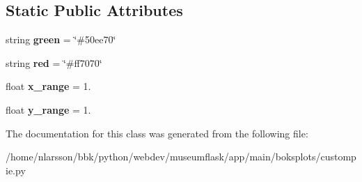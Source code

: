 \subsection*{Static Public Attributes}
\begin{DoxyCompactItemize}
\item 
\mbox{\label{classapp_1_1main_1_1boksplots_1_1custompie_1_1CustomPieBuilder_a37ff9d2647081d878e0f08febc66b9be}} 
string {\bfseries green} = \char`\"{}\#50ee70\char`\"{}
\item 
\mbox{\label{classapp_1_1main_1_1boksplots_1_1custompie_1_1CustomPieBuilder_a8014d4ebb12a2c910a7ca9b3cb6aa76b}} 
string {\bfseries red} = \char`\"{}\#ff7070\char`\"{}
\item 
\mbox{\label{classapp_1_1main_1_1boksplots_1_1custompie_1_1CustomPieBuilder_aa07629eb8f7591d1e06ebd0a1b98ed40}} 
float {\bfseries x\+\_\+range} = 1.
\item 
\mbox{\label{classapp_1_1main_1_1boksplots_1_1custompie_1_1CustomPieBuilder_acbab538280eb6d196e63a9ddc7b4daec}} 
float {\bfseries y\+\_\+range} = 1.
\end{DoxyCompactItemize}


The documentation for this class was generated from the following file\+:\begin{DoxyCompactItemize}
\item 
/home/nlarsson/bbk/python/webdev/museumflask/app/main/boksplots/custompie.\+py\end{DoxyCompactItemize}

